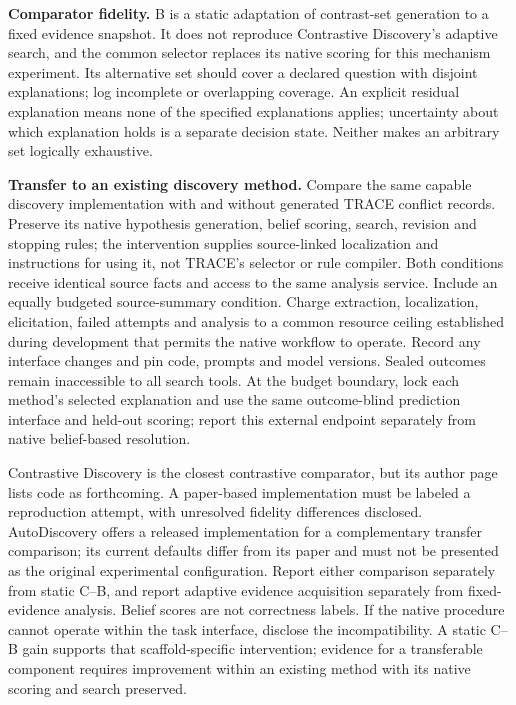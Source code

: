\documentclass[11pt,a4paper]{article}
\begin{document}
\textbf{Comparator fidelity.} B is a static adaptation of contrast-set
generation to a fixed evidence snapshot. It does not reproduce
Contrastive Discovery's adaptive search, and the common selector
replaces its native scoring for this mechanism experiment. Its
alternative set should cover a declared question with disjoint
explanations; log incomplete or overlapping coverage. An explicit
residual explanation means none of the specified explanations applies;
uncertainty about which explanation holds is a separate decision state.
Neither makes an arbitrary set logically exhaustive.

\textbf{Transfer to an existing discovery method.} Compare the same
capable discovery implementation with and without generated TRACE
conflict records. Preserve its native hypothesis generation, belief
scoring, search, revision and stopping rules; the intervention supplies
source-linked localization and instructions for using it, not TRACE's
selector or rule compiler. Both conditions receive identical source
facts and access to the same analysis service. Include an equally
budgeted source-summary condition. Charge extraction, localization,
elicitation, failed attempts and analysis to a common resource ceiling
established during development that permits the native workflow to
operate. Record any interface changes and pin code, prompts and model
versions. Sealed outcomes remain inaccessible to all search tools. At
the budget boundary, lock each method's selected explanation and use the
same outcome-blind prediction interface and held-out scoring; report
this external endpoint separately from native belief-based resolution.

Contrastive Discovery is the closest contrastive comparator, but its
author page lists code as forthcoming. A paper-based implementation must
be labeled a reproduction attempt, with unresolved fidelity differences
disclosed. AutoDiscovery offers a released implementation for a
complementary transfer comparison; its current defaults differ from its
paper and must not be presented as the original experimental
configuration. Report either comparison separately from static C--B, and
report adaptive evidence acquisition separately from fixed-evidence
analysis. Belief scores are not correctness labels. If the native
procedure cannot operate within the task interface, disclose the
incompatibility. A static C--B gain supports that scaffold-specific
intervention; evidence for a transferable component requires improvement
within an existing method with its native scoring and search preserved.
\end{document}
